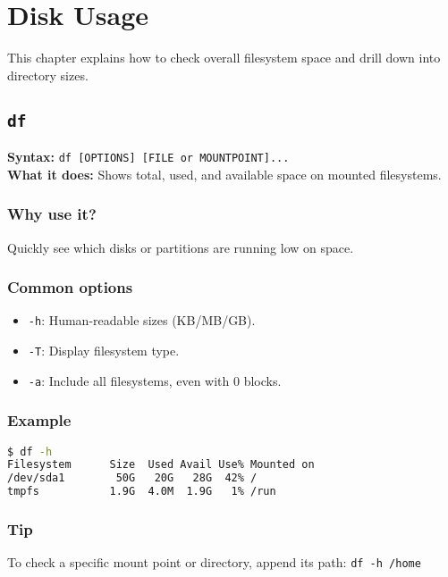 \documentclass[10pt,oneside]{scrbook}
\begin{document}
\chapter{Disk Usage}

This chapter explains how to check overall filesystem space and drill down into directory sizes.

\section{\texttt{df}}
\begin{cmdbox}
  \textbf{Syntax:} \lstinline!df [OPTIONS] [FILE or MOUNTPOINT]...! \\
  \textbf{What it does:} Shows total, used, and available space on mounted filesystems.
\end{cmdbox}
\begin{commanddetails}
  \subsection*{Why use it?}
    Quickly see which disks or partitions are running low on space.

  \subsection*{Common options}
    \begin{itemize}
      \item \lstinline!-h!: Human-readable sizes (KB/MB/GB).  
      \item \lstinline!-T!: Display filesystem type.  
      \item \lstinline!-a!: Include all filesystems, even with 0 blocks.  
    \end{itemize}

  \subsection*{Example}
  \begin{lstlisting}[language=bash]
$ df -h
Filesystem      Size  Used Avail Use% Mounted on
/dev/sda1        50G   20G   28G  42% /
tmpfs           1.9G  4.0M  1.9G   1% /run
  \end{lstlisting}

  \subsection*{Tip}
    To check a specific mount point or directory, append its path:  
    \lstinline!df -h /home!  
\end{commanddetails}
\end{document}
